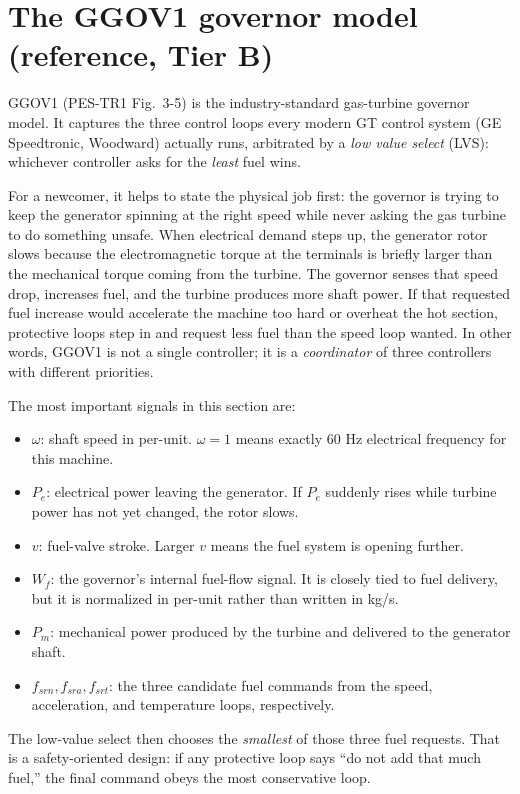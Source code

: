 \documentclass[11pt]{article}
\begin{document}
\section{The GGOV1 governor model (reference, Tier B)}
\label{sec:ggov1}

\textsc{GGOV1} (PES-TR1 Fig.~3-5) is the industry-standard gas-turbine
governor model. It captures the three control loops every modern GT
control system (GE Speedtronic, Woodward) actually runs, arbitrated by a
\emph{low value select} (LVS): whichever controller asks for the
\emph{least} fuel wins.

For a newcomer, it helps to state the physical job first: the governor is
trying to keep the generator spinning at the right speed while never
asking the gas turbine to do something unsafe. When electrical demand
steps up, the generator rotor slows because the electromagnetic torque at
the terminals is briefly larger than the mechanical torque coming from the
turbine. The governor senses that speed drop, increases fuel, and the
turbine produces more shaft power. If that requested fuel increase would
accelerate the machine too hard or overheat the hot section, protective
loops step in and request less fuel than the speed loop wanted. In other
words, GGOV1 is not a single controller; it is a \emph{coordinator} of
three controllers with different priorities.

\begin{novicebox}
The most important signals in this section are:
\begin{itemize}[nosep]
\item $\omega$: shaft speed in per-unit. $\omega = 1$ means exactly 60 Hz
  electrical frequency for this machine.
\item $P_e$: electrical power leaving the generator. If $P_e$ suddenly
  rises while turbine power has not yet changed, the rotor slows.
\item $v$: fuel-valve stroke. Larger $v$ means the fuel system is opening
  further.
\item $W_f$: the governor's internal fuel-flow signal. It is closely tied
  to fuel delivery, but it is normalized in per-unit rather than written
  in kg/s.
\item $P_m$: mechanical power produced by the turbine and delivered to the
  generator shaft.
\item $f_{srn}, f_{sra}, f_{srt}$: the three candidate fuel commands from
  the speed, acceleration, and temperature loops, respectively.
\end{itemize}
The low-value select then chooses the \emph{smallest} of those three fuel
requests. That is a safety-oriented design: if any protective loop says
``do not add that much fuel,'' the final command obeys the most
conservative loop.
\end{novicebox}
\end{document}
